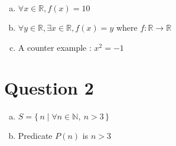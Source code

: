 \documentclass[12pt]{article}
\begin{document}
\begin{enumerate}[a)]
    \item
        $\forall x \in \mathbb{R}, f(x) = 10$

    \item
        $\forall y \in \mathbb{R}, \exists x \in \mathbb{R}, f(x) = y$ where $f: \mathbb{R} \to \mathbb{R}$

    \item
        A counter example : $x^2 = -1$

\end{enumerate}

\section*{Question 2}

\begin{enumerate}[a)]
    \item
        $S = \{\,n \mid \forall n \in \mathbb{N},\:n > 3\,\}$
    \item
        Predicate $P(n)$ is $n > 3$

\end{enumerate}
\end{document}
